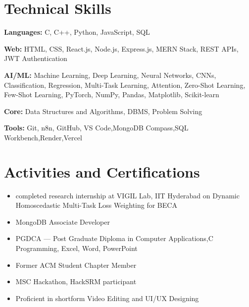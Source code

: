 \documentclass[a4paper,10.5pt]{article}
\begin{document}
\section{Technical Skills}

\textbf{Languages:} C, C++, Python, JavaScript, SQL

\vspace{2pt}

\textbf{Web:} HTML, CSS, React.js, Node.js, Express.js, MERN Stack, REST APIs, JWT Authentication

\vspace{2pt}

\textbf{AI/ML:} Machine Learning, Deep Learning, Neural Networks, CNNs, Classification, Regression, Multi-Task Learning, Attention, Zero-Shot Learning, Few-Shot Learning, PyTorch, NumPy, Pandas, Matplotlib, Scikit-learn

\vspace{2pt}

\textbf{Core:} Data Structures and Algorithms, DBMS, Problem Solving

\vspace{2pt}

\textbf{Tools:} Git, n8n, GitHub, VS Code,MongoDB Compass,SQL Workbench,Render,Vercel


\section{Activities and Certifications}

\begin{itemize}
\item completed research internship at VIGIL Lab, IIT Hyderabad on Dynamic Homoscedastic Multi-Task Loss Weighting for BECA
\item MongoDB Associate Developer
\item PGDCA — Post Graduate Diploma in Computer Applications,C Programming, Excel, Word, PowerPoint
\item Former ACM Student Chapter Member
\item MSC Hackathon, HackSRM participant
\item Proficient in shortform Video Editing and UI/UX Designing
\end{itemize}
\end{document}

